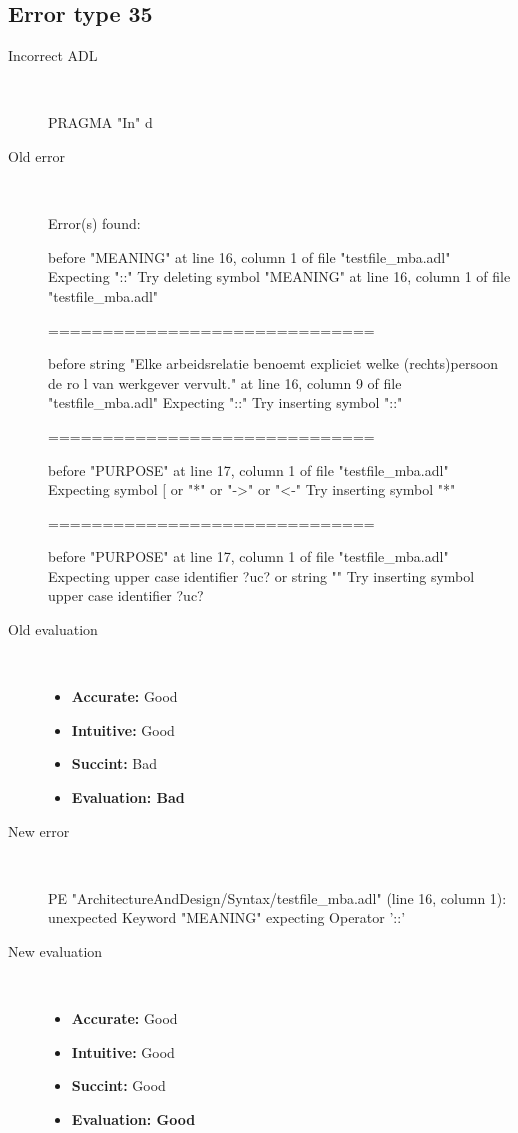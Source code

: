 \hrulefill

\subsection{Error type 35}
  \begin{description}
  \item[Incorrect ADL]~\\
\begin{adl}
PRAGMA "In" d\end{adl}
  \item[Old error]~\\
\begin{haskell}
Error(s) found:

before "MEANING" at line 16, column 1 of file "testfile_mba.adl"
Expecting "::"
Try deleting symbol "MEANING" at line 16, column 1 of file "testfile_mba.adl"

==============================

before string "Elke arbeidsrelatie benoemt expliciet welke (rechts)persoon de ro
l van werkgever vervult." at line 16, column 9 of file "testfile_mba.adl"
Expecting "::"
Try inserting symbol "::"

==============================

before "PURPOSE" at line 17, column 1 of file "testfile_mba.adl"
Expecting symbol [ or "*" or "->" or "<-"
Try inserting symbol "*"

==============================

before "PURPOSE" at line 17, column 1 of file "testfile_mba.adl"
Expecting upper case identifier ?uc? or string ""
Try inserting symbol upper case identifier ?uc?\end{haskell}
  \item[Old evaluation]~\\
    \begin{itemize}
    \item \textbf{Accurate:} Good
    \item \textbf{Intuitive:} Good
    \item \textbf{Succint:} Bad
    \item \textbf{Evaluation: Bad}
    \end{itemize}
  \item[New error]~\\
\begin{haskell}
PE "ArchitectureAndDesign/Syntax/testfile_mba.adl" (line 16, column 1):
unexpected Keyword "MEANING"
expecting Operator '::'
\end{haskell}
  \item[New evaluation]~\\
    \begin{itemize}
    \item \textbf{Accurate:} Good
    \item \textbf{Intuitive:} Good
    \item \textbf{Succint:} Good
    \item \textbf{Evaluation: Good
}
    \end{itemize}
  \end{description}

